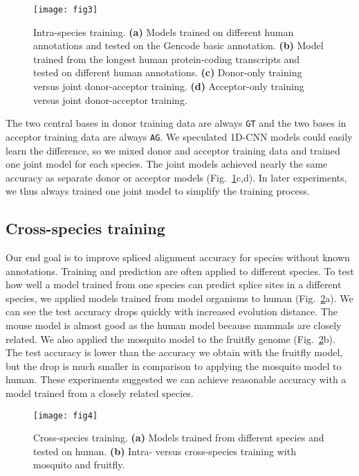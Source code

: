\documentclass[webpdf,contemporary,large,namedate]{oup-authoring-template}%
\begin{document}
\begin{figure}[tb]
\texttt{[image: fig3]}
\caption{Intra-species training.
{\bf (a)} Models trained on different human annotations
and tested on the Gencode basic annotation.
{\bf (b)} Model trained from the longest human protein-coding transcripts
and tested on different human annotations.
{\bf (c)} Donor-only training versus joint donor-acceptor training.
{\bf (d)} Acceptor-only training versus joint donor-acceptor training.}\label{fig:3}
\end{figure}

The two central bases in donor training data are always {\tt GT}
and the two bases in acceptor training data are always {\tt AG}.
We speculated 1D-CNN models could easily learn the difference, so we mixed donor and acceptor training data
and trained one joint model for each species.
The joint models achieved nearly the same accuracy as separate donor or acceptor models (Fig.~\ref{fig:3}c,d).
In later experiments, we thus always trained one joint model to simplify the training process.

\subsection{Cross-species training}

Our end goal is to improve spliced alignment accuracy for species without known annotations.
Training and prediction are often applied to different species.
To test how well a model trained from one species can predict splice sites in a different species,
we applied models trained from model organisms to human (Fig.~\ref{fig:4}a).
We can see the test accuracy drops quickly with increased evolution distance.
The mouse model is almost good as the human model because mammals are closely related.
We also applied the mosquito model to the fruitfly genome (Fig.~\ref{fig:4}b).
The test accuracy is lower than the accuracy we obtain with the fruitfly model,
but the drop is much smaller in comparison to applying the mosquito model to human.
These experiments suggested we can achieve reasonable accuracy with a model trained from a closely related species.

\begin{figure}[bt]
\texttt{[image: fig4]}
\caption{Cross-species training.
{\bf (a)} Models trained from different species and tested on human.
{\bf (b)} Intra- versus cross-species training with mosquito and fruitfly.}\label{fig:4}
\end{figure}
\end{document}
